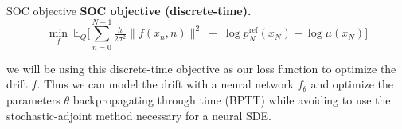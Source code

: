 \documentclass[aspectratio=169,xcolor=dvipsnames]{beamer}
\newenvironment{errorblock}[1]{%
\begingroup%
\setbeamercolor{block title}{bg=darkwine,fg=white}%
\setbeamercolor{block body}{bg=structure!05,fg=black}%
\begin{block}{#1}%
}{\end{block}\endgroup}
\begin{document}
\begin{frame}[t]{SOC objective}
\footnotesize
\medskip
\textbf{SOC objective (discrete-time).}
\[
\boxed{\ \min_{f}\ \mathbb E_Q\!\Big[\sum_{n=0}^{N-1}\tfrac{h}{2\sigma^2}\|f(x_n,n)\|^2\;+\;\log p^{\text{ref}}_N(x_N)-\log \mu(x_N)\Big]\ }
\]

we will be using this discrete-time objective as our loss function to optimize the drift $f$. Thus we can model the drift with a neural network $f_\theta$ and optimize the parameters $\theta$ backpropagating through time (BPTT) while avoiding to use the stochastic-adjoint method necessary for a neural SDE.
\end{frame}






\end{document}
